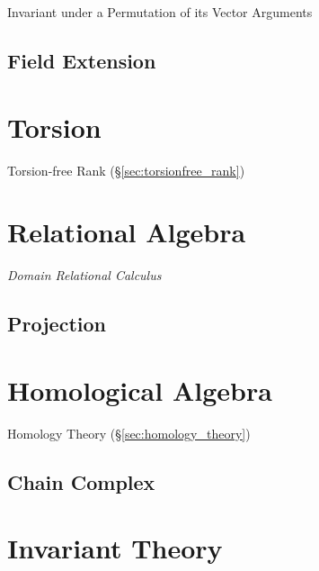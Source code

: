 Invariant under a Permutation of its Vector Arguments



\subsection{Field Extension}\label{sec:field_extension}



\section{Torsion}\label{sec:torsion}

Torsion-free Rank (\S\ref{sec:torsionfree_rank})



\section{Relational Algebra}\label{sec:relational_algebra}

\emph{Domain Relational Calculus}

\subsection{Projection}\label{sec:relational_projection}



\section{Homological Algebra}\label{sec:homological_algebra}

Homology Theory (\S\ref{sec:homology_theory})



\subsection{Chain Complex}\label{sec:chain_complex}



\section{Invariant Theory}\label{sec:invariant_theory}
